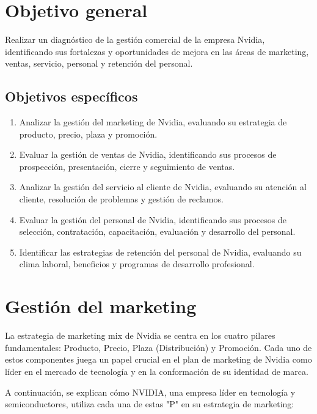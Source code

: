 \documentclass{article}
\newenvironment{objetivoGeneral}{}{}
\begin{document}
\begin{objetivoGeneral}
  \section{Objetivo general}

  Realizar un diagnóstico de la gestión comercial de la empresa Nvidia, identificando sus fortalezas y oportunidades de mejora en las áreas de marketing, ventas, servicio, personal y retención del personal.
  
  \subsection{Objetivos específicos}
  
  \begin{enumerate}
    \item Analizar la gestión del marketing de Nvidia, evaluando su estrategia de producto, precio, plaza y promoción.
    \item Evaluar la gestión de ventas de Nvidia, identificando sus procesos de prospección, presentación, cierre y seguimiento de ventas.
    \item Analizar la gestión del servicio al cliente de Nvidia, evaluando su atención al cliente, resolución de problemas y gestión de reclamos.
    \item Evaluar la gestión del personal de Nvidia, identificando sus procesos de selección, contratación, capacitación, evaluación y desarrollo del personal.
    \item Identificar las estrategias de retención del personal de Nvidia, evaluando su clima laboral, beneficios y programas de desarrollo profesional.
  \end{enumerate}
\end{objetivoGeneral}

\newpage

\section{Gestión del marketing}

La estrategia de marketing mix de Nvidia se centra en los cuatro pilares fundamentales: Producto, Precio, Plaza (Distribución) y Promoción. Cada uno de estos componentes juega un papel crucial en el plan de marketing de Nvidia como líder en el mercado de tecnología y en la conformación de su identidad de marca. 

A continuación, se explican cómo NVIDIA, una empresa líder en tecnología y semiconductores, utiliza cada una de estas "P" en su estrategia de marketing: 
\end{document}
